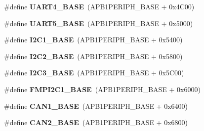 \begin{DoxyCompactItemize}
\item 
\#define {\bfseries U\+A\+R\+T4\+\_\+\+B\+A\+SE}~(A\+P\+B1\+P\+E\+R\+I\+P\+H\+\_\+\+B\+A\+SE + 0x4\+C00)\hypertarget{group___peripheral__memory__map_ga94d92270bf587ccdc3a37a5bb5d20467}{}\label{group___peripheral__memory__map_ga94d92270bf587ccdc3a37a5bb5d20467}

\item 
\#define {\bfseries U\+A\+R\+T5\+\_\+\+B\+A\+SE}~(A\+P\+B1\+P\+E\+R\+I\+P\+H\+\_\+\+B\+A\+SE + 0x5000)\hypertarget{group___peripheral__memory__map_gaa155689c0e206e6994951dc3cf31052a}{}\label{group___peripheral__memory__map_gaa155689c0e206e6994951dc3cf31052a}

\item 
\#define {\bfseries I2\+C1\+\_\+\+B\+A\+SE}~(A\+P\+B1\+P\+E\+R\+I\+P\+H\+\_\+\+B\+A\+SE + 0x5400)\hypertarget{group___peripheral__memory__map_gacd72dbffb1738ca87c838545c4eb85a3}{}\label{group___peripheral__memory__map_gacd72dbffb1738ca87c838545c4eb85a3}

\item 
\#define {\bfseries I2\+C2\+\_\+\+B\+A\+SE}~(A\+P\+B1\+P\+E\+R\+I\+P\+H\+\_\+\+B\+A\+SE + 0x5800)\hypertarget{group___peripheral__memory__map_ga04bda70f25c795fb79f163b633ad4a5d}{}\label{group___peripheral__memory__map_ga04bda70f25c795fb79f163b633ad4a5d}

\item 
\#define {\bfseries I2\+C3\+\_\+\+B\+A\+SE}~(A\+P\+B1\+P\+E\+R\+I\+P\+H\+\_\+\+B\+A\+SE + 0x5\+C00)\hypertarget{group___peripheral__memory__map_ga4e8b9198748235a1729e1e8f8f24983b}{}\label{group___peripheral__memory__map_ga4e8b9198748235a1729e1e8f8f24983b}

\item 
\#define {\bfseries F\+M\+P\+I2\+C1\+\_\+\+B\+A\+SE}~(A\+P\+B1\+P\+E\+R\+I\+P\+H\+\_\+\+B\+A\+SE + 0x6000)\hypertarget{group___peripheral__memory__map_gac6e36f905b89086de0fceda4325a9a8e}{}\label{group___peripheral__memory__map_gac6e36f905b89086de0fceda4325a9a8e}

\item 
\#define {\bfseries C\+A\+N1\+\_\+\+B\+A\+SE}~(A\+P\+B1\+P\+E\+R\+I\+P\+H\+\_\+\+B\+A\+SE + 0x6400)\hypertarget{group___peripheral__memory__map_gad8e45ea6c032d9fce1b0516fff9d8eaa}{}\label{group___peripheral__memory__map_gad8e45ea6c032d9fce1b0516fff9d8eaa}

\item 
\#define {\bfseries C\+A\+N2\+\_\+\+B\+A\+SE}~(A\+P\+B1\+P\+E\+R\+I\+P\+H\+\_\+\+B\+A\+SE + 0x6800)\hypertarget{group___peripheral__memory__map_gaf7b8267b0d439f8f3e82f86be4b9fba1}{}\label{group___peripheral__memory__map_gaf7b8267b0d439f8f3e82f86be4b9fba1}


\end{DoxyCompactItemize}
